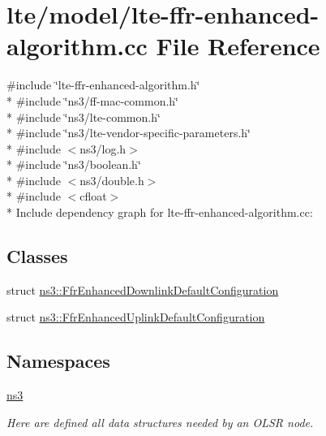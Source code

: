 \hypertarget{lte-ffr-enhanced-algorithm_8cc}{}\section{lte/model/lte-\/ffr-\/enhanced-\/algorithm.cc File Reference}
\label{lte-ffr-enhanced-algorithm_8cc}
{\ttfamily \#include \char`\"{}lte-\/ffr-\/enhanced-\/algorithm.\+h\char`\"{}}\\*
{\ttfamily \#include \char`\"{}ns3/ff-\/mac-\/common.\+h\char`\"{}}\\*
{\ttfamily \#include \char`\"{}ns3/lte-\/common.\+h\char`\"{}}\\*
{\ttfamily \#include \char`\"{}ns3/lte-\/vendor-\/specific-\/parameters.\+h\char`\"{}}\\*
{\ttfamily \#include $<$ns3/log.\+h$>$}\\*
{\ttfamily \#include \char`\"{}ns3/boolean.\+h\char`\"{}}\\*
{\ttfamily \#include $<$ns3/double.\+h$>$}\\*
{\ttfamily \#include $<$cfloat$>$}\\*
Include dependency graph for lte-\/ffr-\/enhanced-\/algorithm.cc\+:
\subsection*{Classes}
\begin{DoxyCompactItemize}
\item 
struct \hyperlink{structns3_1_1FfrEnhancedDownlinkDefaultConfiguration}{ns3\+::\+Ffr\+Enhanced\+Downlink\+Default\+Configuration}
\item 
struct \hyperlink{structns3_1_1FfrEnhancedUplinkDefaultConfiguration}{ns3\+::\+Ffr\+Enhanced\+Uplink\+Default\+Configuration}
\end{DoxyCompactItemize}
\subsection*{Namespaces}
\begin{DoxyCompactItemize}
\item 
 \hyperlink{namespacens3}{ns3}
\begin{DoxyCompactList}\small\item\em Here are defined all data structures needed by an O\+L\+SR node. \end{DoxyCompactList}\end{DoxyCompactItemize}
